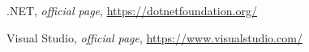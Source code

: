 \begin{thebibliography}{99999}
\singlespace\normalsize

 .NET, \textit{ official page}, \url{https://dotnetfoundation.org/}

 Visual Studio, \textit{ official page}, \url{https://www.visualstudio.com/}

\end{thebibliography}
